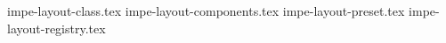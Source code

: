 
\RequirePackage{expl3}
\RequirePackage{xparse}
\RequirePackage{import}

\providecommand{\LayoutDefaultTargets}{all}

\makeatletter
{}
  {\newif\ifNextSystemInstalled\NextSystemInstalledfalse}
  {}
\makeatother

\ifNextSystemInstalled
  
  
  
  
\else
  {impe-layout-class.tex}
  {impe-layout-components.tex}
  {impe-layout-preset.tex}
  {impe-layout-registry.tex}
\fi
